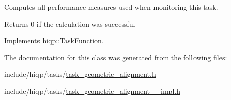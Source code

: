 Computes all performance measures used when monitoring this task. 

\begin{DoxyReturn}{Returns}
0 if the calculation was successful 
\end{DoxyReturn}


Implements \hyperlink{classhiqp_1_1TaskFunction_a47a3283a0c0ebafa17feeca96afe5af0}{hiqp\-::\-Task\-Function}.



The documentation for this class was generated from the following files\-:\begin{DoxyCompactItemize}
\item 
include/hiqp/tasks/\hyperlink{task__geometric__alignment_8h}{task\-\_\-geometric\-\_\-alignment.\-h}\item 
include/hiqp/tasks/\hyperlink{task__geometric__alignment____impl_8h}{task\-\_\-geometric\-\_\-alignment\-\_\-\-\_\-impl.\-h}\end{DoxyCompactItemize}
